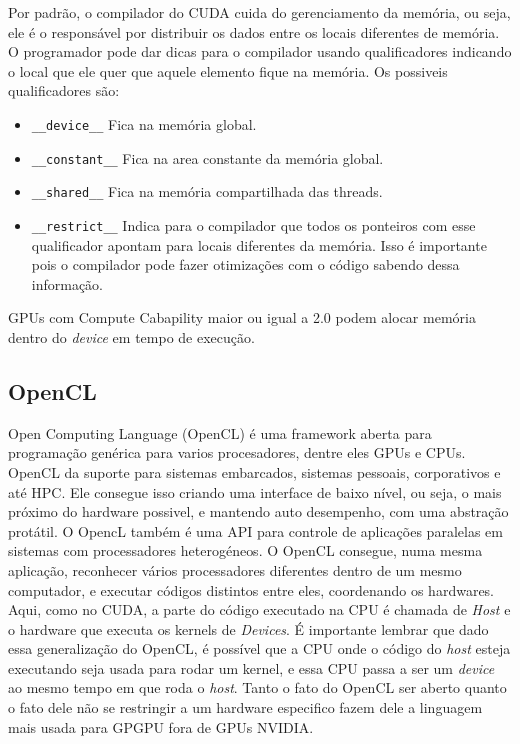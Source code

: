 Por padrão, o compilador do CUDA cuida do gerenciamento da memória, ou seja, ele é o responsável por distribuir os dados 
entre os locais diferentes de memória. O programador pode dar dicas para o compilador usando qualificadores indicando o local
que ele quer que aquele elemento fique na memória. Os possiveis qualificadores são:
\begin{itemize}
  \item \verb#__device__# Fica na memória global.
  \item \verb#__constant__#   Fica na area constante da memória global.
  \item \verb#__shared__# Fica na memória compartilhada das threads.
  \item \verb#__restrict__# Indica para o compilador que todos os ponteiros com esse qualificador apontam para locais diferentes
                            da memória. Isso é importante pois o compilador pode fazer otimizações com o código sabendo dessa informação.   
\end{itemize}

GPUs com Compute Cabapility maior ou igual a 2.0 podem alocar memória dentro do \textit{device} em tempo de execução.

\subsection{OpenCL}
Open Computing Language (OpenCL)\cite{khronosopencl} é uma framework aberta para programação genérica para varios procesadores, 
dentre eles GPUs e CPUs.
OpenCL da suporte para sistemas embarcados, sistemas pessoais, corporativos e até HPC. Ele consegue isso criando uma interface
de baixo nível, ou seja, o mais próximo do hardware possivel, e mantendo auto desempenho, com uma abstração protátil. O OpencL
também é uma API para controle de aplicações paralelas em sistemas com processadores heterogéneos. O OpenCL consegue, numa mesma
aplicação, reconhecer vários processadores diferentes dentro de um mesmo computador, e executar códigos distintos entre eles,
coordenando os hardwares. Aqui, como no CUDA, a parte do código executado na CPU é chamada de \textit{Host} e o hardware
que executa os kernels de \textit{Devices}. É importante lembrar que dado essa generalização do OpenCL, é possível que a CPU
onde o código do \textit{host} esteja executando seja usada para rodar um kernel, e essa CPU passa a ser um \textit{device}
ao mesmo tempo em que roda o \textit{host}. Tanto o fato do OpenCL ser aberto quanto o fato dele não se restringir a um
hardware especifico fazem dele a linguagem mais usada para GPGPU fora de GPUs NVIDIA.

